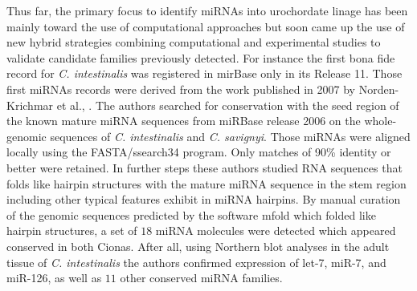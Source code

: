 \documentclass[graybox]{svmult}
\begin{document}
Thus far, the primary focus to identify miRNAs into urochordate linage has been 
mainly toward the use of computational approaches but soon came up the use of 
new hybrid strategies combining computational and experimental studies to 
validate candidate families previously detected. For instance the first bona 
fide record for \textit{C. intestinalis} was registered in mirBase only in its 
Release 11. Those first miRNAs records were derived from the work published in 
2007 by Norden-Krichmar et al., \cite{Norden-Krichmar2007}. The authors searched 
for conservation with the seed region of the known mature miRNA sequences from 
miRBase release 2006 on the whole-genomic sequences of \textit{C. intestinalis} 
and \textit{C. savignyi}. Those miRNAs were aligned locally using the 
FASTA/ssearch34 program. Only matches of 90\% identity or better were retained. 
In further steps these authors studied RNA sequences that folds like hairpin 
structures with the mature miRNA sequence in the stem region including other 
typical features exhibit in miRNA hairpins. By manual curation of the genomic 
sequences predicted by the software mfold which folded like hairpin structures, 
a set of $18$ miRNA molecules were detected which appeared conserved in both 
Cionas. After all, using  Northern blot analyses in the adult tissue of 
\textit{C. intestinalis} the authors confirmed expression of  let-7, miR-7, and 
miR-126, as well as $11$ other conserved miRNA families.
\end{document}
